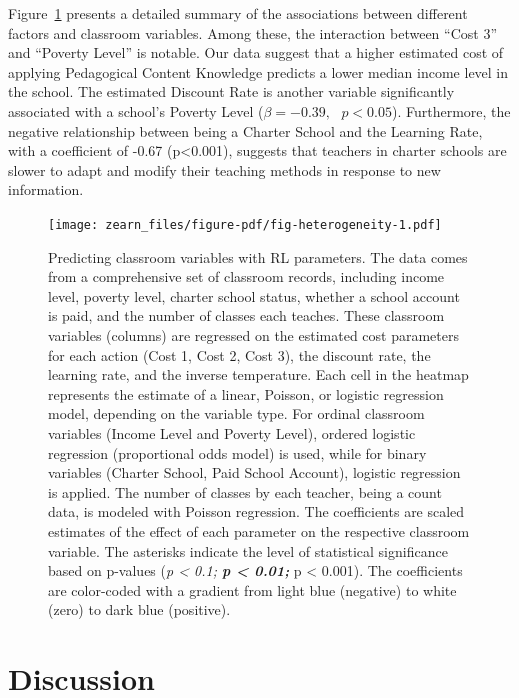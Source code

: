 \documentclass[
  number,
  preprint,
  3p,
  onecolumn]{elsarticle}
\begin{document}
Figure~\ref{fig-heterogeneity} presents a detailed summary of the
associations between different factors and classroom variables. Among
these, the interaction between ``Cost 3'' and ``Poverty Level'' is
notable. Our data suggest that a higher estimated cost of applying
Pedagogical Content Knowledge predicts a lower median income level in
the school. The estimated Discount Rate is another variable
significantly associated with a school's Poverty Level
(\(\beta = -0.39,\text{ } p<0.05\)). Furthermore, the negative
relationship between being a Charter School and the Learning Rate, with
a coefficient of -0.67 (p\textless0.001), suggests that teachers in
charter schools are slower to adapt and modify their teaching methods in
response to new information.

\begin{figure}

{\centering \texttt{[image: zearn\_files/figure-pdf/fig-heterogeneity-1.pdf]}

}

\caption{\label{fig-heterogeneity}Predicting classroom variables with RL
parameters. The data comes from a comprehensive set of classroom
records, including income level, poverty level, charter school status,
whether a school account is paid, and the number of classes each
teaches. These classroom variables (columns) are regressed on the
estimated cost parameters for each action (Cost 1, Cost 2, Cost 3), the
discount rate, the learning rate, and the inverse temperature. Each cell
in the heatmap represents the estimate of a linear, Poisson, or logistic
regression model, depending on the variable type. For ordinal classroom
variables (Income Level and Poverty Level), ordered logistic regression
(proportional odds model) is used, while for binary variables (Charter
School, Paid School Account), logistic regression is applied. The number
of classes by each teacher, being a count data, is modeled with Poisson
regression. The coefficients are scaled estimates of the effect of each
parameter on the respective classroom variable. The asterisks indicate
the level of statistical significance based on p-values (\emph{p
\textless{} 0.1; \textbf{p \textless{} 0.01; }}p \textless{} 0.001). The
coefficients are color-coded with a gradient from light blue (negative)
to white (zero) to dark blue (positive).}

\end{figure}

\hypertarget{discussion}{%
\section{Discussion}\label{discussion}}
\end{document}
